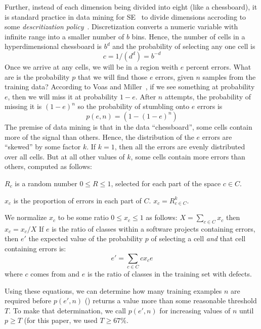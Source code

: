 Further,
instead of each dimension being divided into eight (like a chessboard), it is standard practice in data mining for SE~\cite{Menzies2014a}
to divide dimensions accroding to some {\em descritization policy}~\cite{lust08}.
Discretization converts a numeric variable with infinite range into a smaller number of  $b$ bins. Hence, the number of cells in a
hyperdimensional chessboard is $b^d$ and the probability of selecting any one cell is
\begin{equation}\label{eq:c}c=1/(d^d)=b^{-d}\end{equation}
Once we arrive at any cells, we will be in a region weith $e$ percent errors.
What are is the probability $p$ that we will find those $e$ errors, given $n$ samples from the training data?
According to Voas and Miller~\cite{voas1995software},
if we see something at probability $e$, then we will miss it at probability $1-e$.
After $n$ attempts, the probability of missing it is $(1-e)^n$ so the probability of stumbling onto $e$ errors is
\begin{equation}\label{eq:p}
p(e,n) = (1-(1-e)^n)
\end{equation}
The premise of data mining is that in the data ``chessboard'', some cells contain more of the signal than others. Hence, the 
distribution of the $e$ errors are ``skewed'' by some factor $k$. If $k=1$, then all the errors are evenly distributed over all cells.
But at all other values of $k$, some cells contain more errors than others, computed as follows:
    \bi
  \item $R_c$ is a random number $0\le R \le 1$, selected for each part of the space $c\in C$.
  \item $x_c$ is the proportion of errors in each part of $C$. \mbox{$x_c =  R_{c\in C}^k$}.
  \item We normalize $x_c$ to be some ratio $0 \le x_c \le 1$ as follows: $X= \sum_{c\in C} x_c$ then $x_c = x_c/X$
    \ei
    If  $e$ is the ratio of classes within a software projects containing errors, then $e'$ 
    the expected value of the probability $p$ of selecting a cell {\em and} that cell containing errors is:
    \begin{equation}\label{eq:p}
      e' = \sum_{c\in C}cx_ce
    \end{equation}
    where $c$ comes from  and $e$ is the ratio of classes in the training set with defects.

Using these equations, we can determine how many training examples $n$ are required before 
  $p(e',n)$ () returns a value more than some reasonable threshold $T$.
  To make that determination, we call $p(e',n)$ for increasing values of $n$ until $p \ge T$
  (for this paper, we used $T \ge 67\%$.
  
